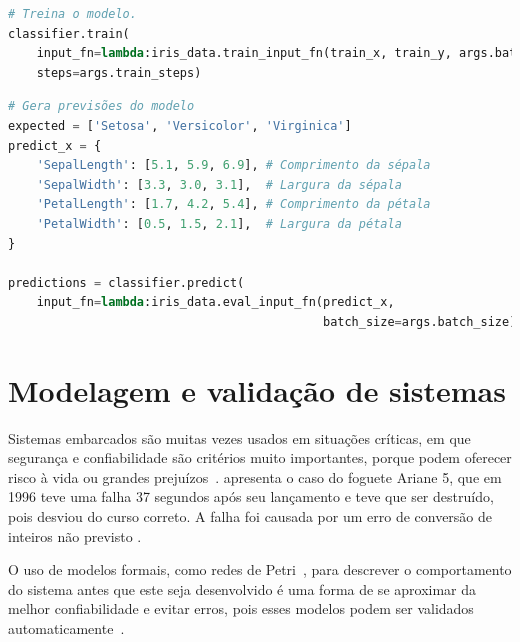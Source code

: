 \begin{lstlisting}[language=Python,caption={Treinando o classificador no TensorFlow},label={lst:tf_dnn_2}]
# Treina o modelo.
classifier.train(
    input_fn=lambda:iris_data.train_input_fn(train_x, train_y, args.batch_size),
    steps=args.train_steps)
\end{lstlisting}

\begin{lstlisting}[language=Python,caption={Fazendo previsões a partir do modelo treinado no TensorFlow},label={lst:tf_dnn_3}]
# Gera previsões do modelo
expected = ['Setosa', 'Versicolor', 'Virginica']
predict_x = {
    'SepalLength': [5.1, 5.9, 6.9], # Comprimento da sépala
    'SepalWidth': [3.3, 3.0, 3.1],  # Largura da sépala
    'PetalLength': [1.7, 4.2, 5.4], # Comprimento da pétala
    'PetalWidth': [0.5, 1.5, 2.1],  # Largura da pétala
}

predictions = classifier.predict(
    input_fn=lambda:iris_data.eval_input_fn(predict_x,
                                            batch_size=args.batch_size))

\end{lstlisting}


\section{Modelagem e validação de sistemas}\label{sec:modelosformais}

Sistemas embarcados são muitas vezes usados em situações críticas, em que segurança e confiabilidade são critérios muito importantes, porque podem oferecer risco à vida ou grandes prejuízos~\cite{edwards:1997}.  apresenta o caso do foguete Ariane 5, que em 1996 teve uma falha 37 segundos após seu lançamento e teve que ser destruído, pois desviou do curso correto. A falha foi causada por um erro de conversão de inteiros não previsto \cite{buttazzo2011:realtime}.

O uso de modelos formais, como redes de Petri~\cite{peterson:1981}, para descrever o comportamento do sistema antes que este seja desenvolvido é uma forma de se aproximar da melhor confiabilidade e evitar erros, pois esses modelos podem ser validados automaticamente~\cite{edwards:1997}.

